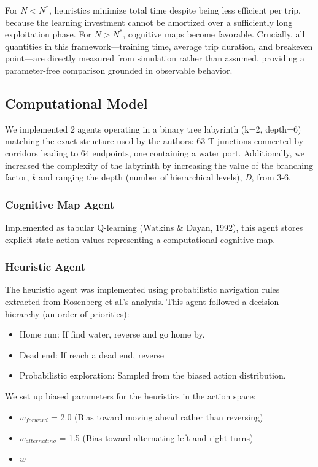 For $N < N^*$, heuristics minimize total time despite being less efficient per trip, because the learning investment cannot be amortized over a sufficiently long exploitation phase. For $N > N^*$, cognitive maps become favorable. Crucially, all quantities in this framework—training time, average trip duration, and breakeven point—are directly measured from simulation rather than assumed, providing a parameter-free comparison grounded in observable behavior.

\subsection{Computational Model}
We implemented 2 agents operating in a binary tree labyrinth (k=2, depth=6) matching the exact structure used by the authors: 63 T-junctions connected by corridors leading to 64 endpoints, one containing a water port. Additionally, we increased the complexity of the labyrinth by increasing the value of the branching factor, \textit{k} and ranging the depth (number of hierarchical levels), \textit{D}, from 3-6.

\subsubsection{Cognitive Map Agent}
Implemented as tabular Q-learning (Watkins \& Dayan, 1992), this agent stores explicit state-action values representing a computational cognitive map.

\subsubsection{Heuristic Agent}
The heuristic agent was implemented using probabilistic navigation rules extracted from Rosenberg et al.'s analysis. This agent followed a decision hierarchy (an order of priorities):
\begin{itemize}
    \item Home run: If find water, reverse and go home by.
    \item Dead end: If reach a dead end, reverse 
    \item Probabilistic exploration: Sampled from the biased action distribution.
\end{itemize}
We set up biased parameters for the heuristics in the action space:
\begin{itemize}
    \item $w_\textit{forward}$ = 2.0 (Bias toward moving ahead rather than reversing)
    \item $w_\textit{alternating}$ = 1.5 (Bias toward alternating left and right turns)
    \item $w_\textit{}$
\end{itemize}
